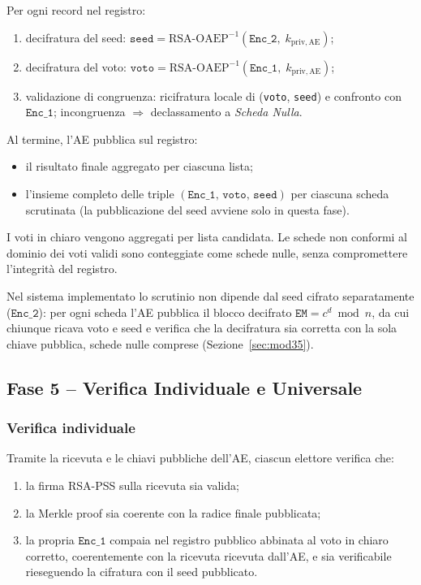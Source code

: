 \documentclass[12pt,a4paper]{article}
\begin{document}
Per ogni record nel registro:
\begin{enumerate}
  \item decifratura del seed: $\mathtt{seed} = \mathrm{RSA\text{-}OAEP}^{-1}(\mathtt{Enc\_2},\; k_{\mathrm{priv,AE}})$;
  \item decifratura del voto: $\mathtt{voto} = \mathrm{RSA\text{-}OAEP}^{-1}(\mathtt{Enc\_1},\; k_{\mathrm{priv,AE}})$;
  \item validazione di congruenza: ricifratura locale di (\texttt{voto}, \texttt{seed}) e
    confronto con $\mathtt{Enc\_1}$; incongruenza $\Rightarrow$ declassamento a
    \textit{Scheda Nulla}.
\end{enumerate}

Al termine, l'AE pubblica sul registro:
\begin{itemize}
  \item il risultato finale aggregato per ciascuna lista;
  \item l'insieme completo delle triple $(\mathtt{Enc\_1},\, \mathtt{voto},\, \mathtt{seed})$ per
    ciascuna scheda scrutinata (la pubblicazione del seed avviene solo in questa fase).
\end{itemize}

I voti in chiaro vengono aggregati per lista candidata. Le schede non conformi al dominio dei
voti validi sono conteggiate come schede nulle, senza compromettere l'integrità del registro.

Nel sistema implementato lo scrutinio non dipende dal seed cifrato separatamente
($\mathtt{Enc\_2}$): per ogni scheda l'AE pubblica il blocco decifrato
$\mathtt{EM} = c^{d} \bmod n$, da cui chiunque ricava voto e seed e verifica che la
decifratura sia corretta con la sola chiave pubblica, schede nulle comprese
(Sezione~\ref{sec:mod35}).

\subsection{Fase 5 – Verifica Individuale e Universale}

\subsubsection{Verifica individuale}
Tramite la ricevuta e le chiavi pubbliche dell'AE, ciascun elettore verifica che:
\begin{enumerate}
  \item la firma RSA-PSS sulla ricevuta sia valida;
  \item la Merkle proof sia coerente con la radice finale pubblicata;
  \item la propria $\mathtt{Enc\_1}$ compaia nel registro pubblico abbinata al voto in chiaro
    corretto, coerentemente con la ricevuta ricevuta dall'AE, e sia verificabile rieseguendo
    la cifratura con il seed pubblicato.
\end{enumerate}
\end{document}
